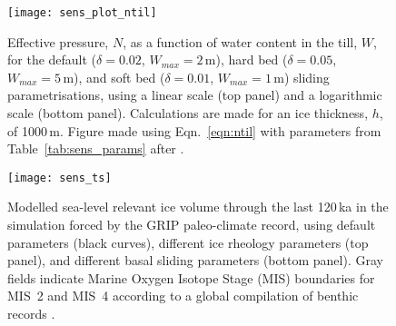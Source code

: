 \begin{figure}
    \centering
    \texttt{[image: sens\_plot\_ntil]}
    \caption{Effective pressure, $N$, as a function of water content in the
             till, $W$, for the default ($\delta=0.02$, $W_{max}=2$\,m),
             hard bed ($\delta=0.05$, $W_{max}=5$\,m), and soft bed
             ($\delta=0.01$, $W_{max}=1$\,m) sliding parametrisations, using a
             linear scale (top panel) and a logarithmic scale (bottom panel).
             Calculations are made for an ice thickness, $h$, of 1000\,m.
             Figure made using Eqn.~\ref{eqn:ntil} with parameters from
             Table~\ref{tab:sens_params} after
             \citet[Fig.~1]{Bueler.Pelt.2015}.}
    \label{fig:sens_plot_ntil}
\end{figure}

\begin{figure*}
  \centering
  \texttt{[image: sens\_ts]}
  \caption{Modelled sea-level relevant ice volume through the last 120\,ka
           in the simulation forced by the GRIP paleo-climate record, using
           default parameters (black curves), different ice rheology parameters
           (top panel), and different basal sliding parameters (bottom panel).
           Gray fields indicate Marine Oxygen Isotope Stage (MIS) boundaries
           for MIS~2 and MIS~4 according to a global compilation of benthic
            records \citep{Lisiecki.Raymo.2005}.}
  \label{fig:sens_ts}
\end{figure*}


